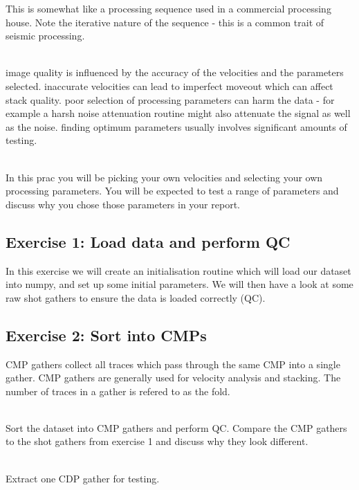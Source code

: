 \documentclass[a4paper, 10pt]{article}
\begin{document}
This is somewhat like a processing sequence used in a commercial processing house.  Note the iterative nature of the sequence - this is a common trait of seismic processing.
\par~\\
image quality is influenced by the accuracy of the velocities and the parameters selected.  inaccurate velocities can lead to imperfect moveout which can affect stack quality.  poor selection of processing parameters can harm the data - for example a harsh noise attenuation routine might also attenuate the signal as well as the noise. finding optimum parameters usually involves significant amounts of testing.
\par~\\
In this prac you will be picking your own velocities and selecting your own processing parameters.  You will be expected to test a range of parameters and discuss why you chose those parameters in your report.  
\subsection*{Exercise 1: Load data and perform QC}
In this exercise we will create an initialisation routine which will load our dataset into numpy, and set up some initial parameters. We will then have a look at some raw shot gathers to ensure the data is loaded correctly (QC).
\subsection*{Exercise 2: Sort into CMPs}
CMP gathers collect all traces which pass through the same CMP into a single gather.  CMP gathers are generally used for velocity analysis and stacking. The number of traces in a gather is refered to as the fold.  
\par~\\
Sort the dataset into CMP gathers and perform QC.  Compare the CMP gathers to the shot gathers from exercise 1 and discuss why they look different.
\par~\\
Extract one CDP gather for testing.  
\end{document}
